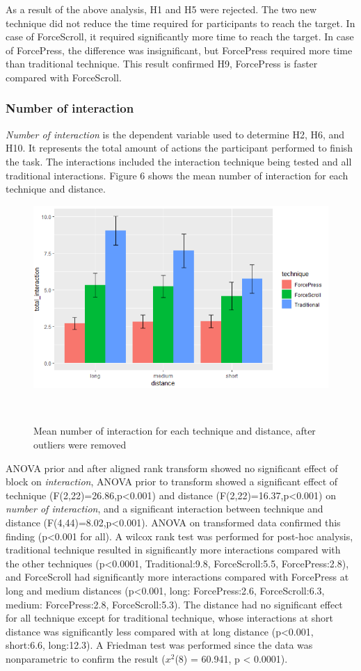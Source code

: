 \documentclass{sigchi}
\begin{document}
As a result of the above analysis, H1 and H5 were rejected. The two new technique did not reduce the time required for participants to reach the target. In case of ForceScroll, it required significantly more time to reach the target. In case of ForcePress, the difference was insignificant, but ForcePress required more time than traditional technique. This result confirmed H9, ForcePress is faster compared with ForceScroll.


\subsubsection{Number of interaction}
\textit{Number of interaction} is the dependent variable used to determine H2, H6, and H10. It represents the total amount of actions the participant performed to finish the task. The interactions included the interaction technique being tested and all traditional interactions. Figure 6 shows the mean number of interaction for each technique and distance. 
\begin{figure}[!h]
	\centering
	\includegraphics[width=0.8\columnwidth]{figures/figure5}
	\caption{Mean number of interaction for each technique and distance, after outliers were removed}~\label{fig:figure6}
\end{figure}

ANOVA prior and after aligned rank transform showed no significant effect of block on \textit{interaction}, ANOVA prior to transform showed a significant effect of technique (F(2,22)=26.86,p<0.001) and distance (F(2,22)=16.37,p<0.001) on \textit{number of interaction}, and a significant interaction between technique and distance (F(4,44)=8.02,p<0.001). ANOVA on transformed data confirmed this finding (p<0.001 for all). A wilcox rank test was performed for post-hoc analysis, traditional technique resulted in significantly more interactions compared with the other techniques (p<0.0001, Traditional:9.8, ForceScroll:5.5, ForcePress:2.8), and ForceScroll had significantly more interactions compared with ForcePress at long and medium distances (p<0.001, long: ForcePress:2.6, ForceScroll:6.3, medium: ForcePress:2.8, ForceScroll:5.3). The distance had no significant effect for all technique except for traditional technique, whose interactions at short distance was significantly less compared with at long distance (p<0.001, short:6.6, long:12.3). A Friedman test was performed since the data was nonparametric to confirm the result ($x^{2}$(8) = 60.941, p < 0.0001).%
\end{document}
